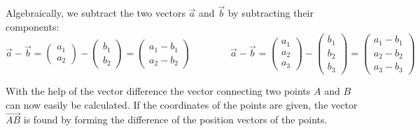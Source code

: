 \documentclass[12pt,eng]{skript_ogg}
\begin{document}
\begin{wichtig}
Algebraically, we subtract the two vectors $\vec{a}$ and $\vec{b}$ by subtracting their components:
\[\vec{a}-\vec{b}=\begin{pmatrix} a_1\\a_2
\end{pmatrix}-\begin{pmatrix}
b_1\\b_2
\end{pmatrix}=\begin{pmatrix}
a_1-b_1\\a_2-b_2
\end{pmatrix}\qquad\qquad\vec{a}-\vec{b}=\begin{pmatrix} a_1\\a_2\\a_3
\end{pmatrix}-\begin{pmatrix}
b_1\\b_2\\b_3
\end{pmatrix}=\begin{pmatrix}
a_1-b_1\\a_2-b_2\\a_3-b_3
\end{pmatrix}\]
\end{wichtig}

With the help of the vector difference the vector connecting two points $A$ and $B$ can now easily be calculated. If the coordinates of the points are given, the vector $\overrightarrow{AB}$ is found by forming the difference of the position vectors of the points.
\end{document}
